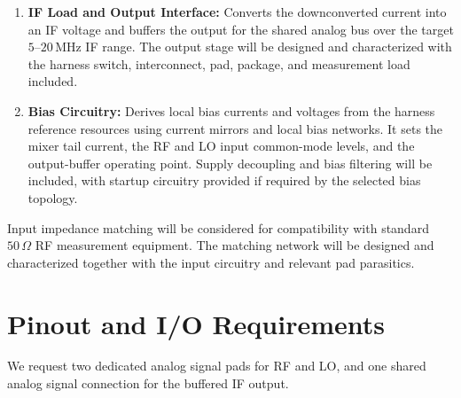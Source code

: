 \documentclass[11pt,letterpaper]{article}
\begin{document}
\begin{enumerate}
    \item \textbf{IF Load and Output Interface:}
    Converts the downconverted current into an IF voltage and buffers the output for the shared analog bus over the target \(5\)--\(20\,\mathrm{MHz}\) IF range.
    The output stage will be designed and characterized with the harness switch, interconnect, pad, package, and measurement load included.

    \item \textbf{Bias Circuitry:}
    Derives local bias currents and voltages from the harness reference resources using current mirrors and local bias networks.
    It sets the mixer tail current, the RF and LO input common-mode levels, and the output-buffer operating point.
    Supply decoupling and bias filtering will be included, with startup circuitry provided if required by the selected bias topology.
\end{enumerate}

Input impedance matching will be considered for compatibility with standard \(50\,\Omega\) RF measurement equipment.
The matching network will be designed and characterized together with the input circuitry and relevant pad parasitics.


\section{Pinout and I/O Requirements}

We request two dedicated analog signal pads for RF and LO, and one shared analog signal connection for the buffered IF output.
\end{document}
